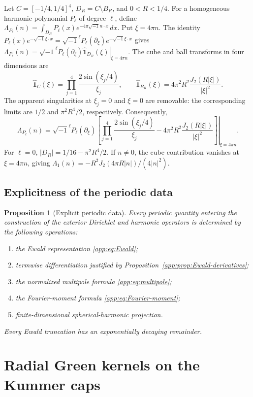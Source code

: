 \documentclass[11pt,a4paper,twoside]{article}
\numberwithin{equation}{section}
\newtheorem{proposition}[theorem]{Proposition}
\theoremstyle{definition}
\theoremstyle{remark}
\newcommand{\ii}{\sqrt{-1}}
\begin{document}
Let \(C=[-1/4,1/4]^4\), \(D_R=C\setminus B_R\), and
\(0<R<1/4\). For a homogeneous harmonic polynomial \(P_\ell\)
of degree \(\ell\), define
\(\Lambda_{P_\ell}(n)=\int_{D_R}P_\ell(x)e^{-4\pi\ii n\cdot x}\,dx\).
Put \(\xi=4\pi n\). The identity
\(P_\ell(x)e^{-\ii\xi\cdot x}
=\ii^\ell P_\ell(\partial_\xi)e^{-\ii\xi\cdot x}\) gives
\(\Lambda_{P_\ell}(n)=
\left.\ii^\ell P_\ell(\partial_\xi)
\widehat{\mathbf1}_{D_R}(\xi)\right|_{\xi=4\pi n}\).
The cube and ball transforms in four dimensions are
\[
\widehat{\mathbf1}_C(\xi)=\prod_{j=1}^4
\frac{2\sin(\xi_j/4)}{\xi_j},
\qquad
\widehat{\mathbf1}_{B_R}(\xi)=4\pi^2R^2
\frac{J_2(R|\xi|)}{|\xi|^2}.
\]
The apparent singularities at \(\xi_j=0\) and \(\xi=0\) are
removable: the corresponding limits are \(1/2\) and
\(\pi^2R^4/2\), respectively.
Consequently,
\begin{equation}\label{app:eq:Fourier-moment}
\Lambda_{P_\ell}(n)=\left.\ii^\ell P_\ell(\partial_\xi)
\left[\prod_{j=1}^4\frac{2\sin(\xi_j/4)}{\xi_j}
-4\pi^2R^2\frac{J_2(R|\xi|)}{|\xi|^2}\right]
\right|_{\xi=4\pi n}.
\end{equation}
For \(\ell=0\), \(|D_R|=1/16-\pi^2R^4/2\). If \(n\ne0\),
the cube contribution vanishes at \(\xi=4\pi n\), giving
\(\Lambda_1(n)=-R^2J_2(4\pi R|n|)/(4|n|^2)\).

\subsection{Explicitness of the periodic data}

\begin{proposition}[Explicit periodic data]
\label{app:prop:explicit-periodic}
Every periodic quantity entering the construction of the exterior
Dirichlet and harmonic operators is determined by the following
operations:
\begin{enumerate}
\item the Ewald representation \eqref{app:eq:Ewald};
\item termwise differentiation justified by
Proposition~\ref{app:prop:Ewald-derivatives};
\item the normalized multipole formula \eqref{app:eq:multipole};
\item the Fourier-moment formula \eqref{app:eq:Fourier-moment};
\item finite-dimensional spherical-harmonic projection.
\end{enumerate}
Every Ewald truncation has an exponentially decaying remainder.
\end{proposition}
\section{Radial Green kernels on the Kummer caps}
\label{app:EH-kernels}
\end{document}

